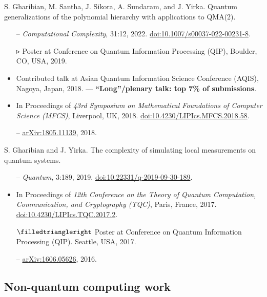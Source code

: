 \documentclass[11pt,letterpaper,serif]{moderncv}
\newcommand{\pubItemSep}{0em}
\begin{document}
S. Gharibian, M. Santha, J. Sikora, A. Sundaram, and J. Yirka.\quad
Quantum generalizations of the polynomial hierarchy with applications to QMA(2).
\begin{adjustwidth}{.1in}{}
	\begin{itemize}
		\item[--] \textit{Computational Complexity}, 31:12, 2022.\quad
		\href{https://doi.org/10.1007/s00037-022-00231-8}{doi:10.1007/s00037-022-00231-8}.
		\item[$\smalltriangleright$] Poster at Conference on Quantum Information Processing (QIP), Boulder, CO, USA, 2019.
		\item Contributed talk at Asian Quantum Information Science Conference (AQIS), Nagoya, Japan, 2018. --- \textbf{``Long''/plenary talk: top 7\% of submissions}.
		\item In Proceedings of \textit{43rd Symposium on Mathematical Foundations of Computer Science (MFCS)}, Liverpool, UK, 2018. \quad
		\href{https://doi.org/10.4230/LIPIcs.MFCS.2018.58}{doi:10.4230/LIPIcs.MFCS.2018.58}.
		\item[--] \href{https://arxiv.org/abs/1805.11139}{arXiv:1805.11139}, 2018.
	\end{itemize}
\end{adjustwidth}
\medskip

S. Gharibian and J. Yirka.\quad
The complexity of simulating local measurements on quantum systems.
\begin{adjustwidth}{.1in}{}
	\begin{itemize}[itemsep=\pubItemSep]
		\item[--] \textit{Quantum}, 3:189, 2019. \quad
		\href{https://doi.org/10.22331/q-2019-09-30-189}{doi:10.22331/q-2019-09-30-189}.
		\item In Proceedings of \textit{12th Conference on the Theory of Quantum Computation, Communication,
		and Cryptography (TQC)}, Paris, France, 2017. \quad
		\href{https://doi.org/10.4230/LIPIcs.TQC.2017.2}{doi:10.4230/LIPIcs.TQC.2017.2}.
		\item[$\filledtriangleright$] Poster at Conference on Quantum Information Processing (QIP). Seattle, USA, 2017.
		\item[--] \href{https://arxiv.org/abs/1606.05626}{arXiv:1606.05626}, 2016.
	\end{itemize}
\end{adjustwidth}
\medskip

\subsection{Non-quantum computing work}
\end{document}
